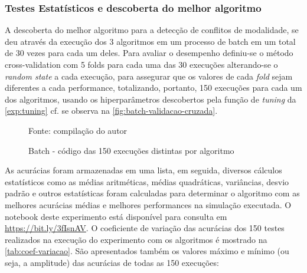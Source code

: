 \subsubsection{Testes Estatísticos e descoberta do melhor algoritmo}\label{teste-estatistico}
A descoberta do melhor algoritmo para a detecção de conflitos de modalidade, se deu através da execução dos 3 algoritmos em um processo de batch em um total de 30 vezes para cada um deles. Para avaliar o desempenho definiu-se o método cross-validation com 5 folds para cada uma das 30 execuções alterando-se o \textit{random state} a cada execução, para assegurar que os valores de cada \textit{fold} sejam diferentes a cada performance, totalizando, portanto, 150 execuções para cada um dos algoritmos, usando os hiperparâmetros descobertos pela função de \textit{tuning} da \autoref{exp:tuning} cf. se observa na \autoref{fig:batch-validacao-cruzada}.
\begin{figure}[h!]
	\centering
	\caption{Batch - código das 150 execuções distintas por algoritmo}
	
	\label{fig:batch-validacao-cruzada}
	{\scriptsize Fonte: compilação do autor}
\end{figure}

As acurácias foram armazenadas em uma lista, em seguida, diversos cálculos estatísticos como as médias aritméticas, médias quadráticas, variâncias, desvio padrão e outros estatísticas foram calculadas para determinar o algoritmo com as melhores acurácias médias e melhores performances na simulação executada. O notebook deste experimento está disponível para consulta em \url{https://bit.ly/3fIsnAV}.
O coeficiente de variação das acurácias dos 150 testes realizados na execução do experimento com os algoritmos é mostrado na \autoref{tab:coef-variacao}. São apresentados também os valores máximo e mínimo (ou seja, a amplitude) das acurácias de todas as 150 execuções:

